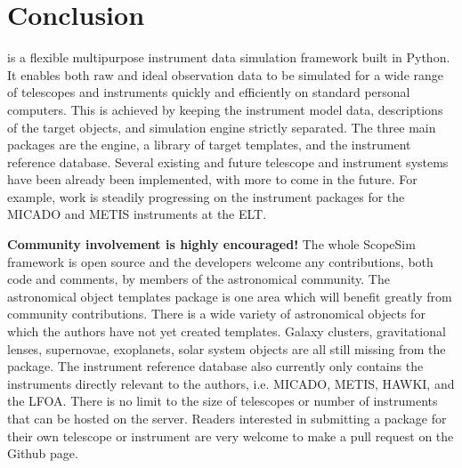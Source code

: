 \section{Conclusion}
\label{conclusion}

\ScopeSim{} is a flexible multipurpose instrument data simulation framework built in Python.
It enables both raw and ideal observation data to be simulated for a wide range of telescopes and instruments quickly and efficiently on standard personal computers.
This is achieved by keeping the instrument model data, descriptions of the target objects, and simulation engine strictly separated.
The three main packages are the \ScopeSim{} engine, a library of target templates, and the instrument reference database.
Several existing and future telescope and instrument systems have been already been implemented, with more to come in the future.
For example, work is steadily progressing on the instrument packages for the MICADO and METIS\cite{metis2018} instruments at the ELT.

\textbf{Community involvement is highly encouraged!}
The whole ScopeSim framework is open source and the developers welcome any contributions, both code and comments, by members of the astronomical community.
The astronomical object templates package is one area which will benefit greatly from community contributions.
There is a wide variety of astronomical objects for which the authors have not yet created templates.
Galaxy clusters, gravitational lenses, supernovae, exoplanets, solar system objects are all still missing from the \ScopeSimtemplates{} package.
The instrument reference database also currently only contains the instruments directly relevant to the authors, i.e. MICADO, METIS, HAWKI, and the LFOA.
There is no limit to the size of telescopes or number of instruments that can be hosted on the server.
Readers interested in submitting a package for their own telescope or instrument are very welcome to make a pull request on the \IRDB{} Github page.

